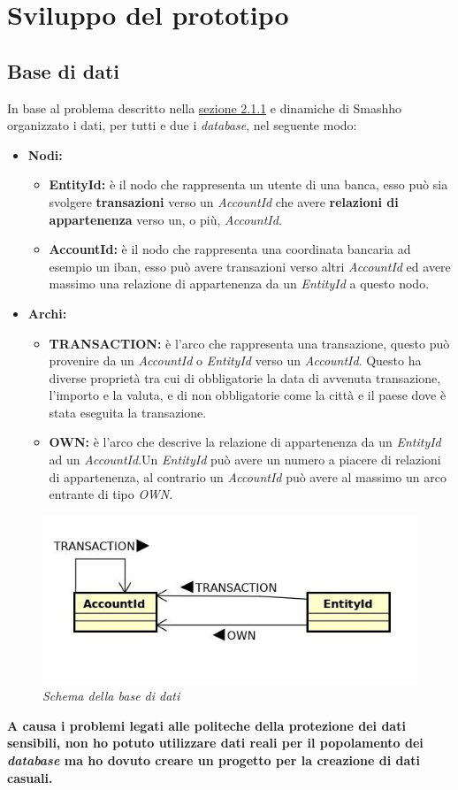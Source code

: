 \section{Sviluppo del prototipo}
\subsection{Base di dati}
In base al problema descritto nella \hyperref[sec:prob]{sezione 2.1.1} e dinamiche di Smash\textregistered ho organizzato i dati, per tutti e due i \textit{database}, nel seguente modo:
\begin{itemize}
\item{\textbf{Nodi:}}
\begin{itemize}
\item{\textbf{EntityId:}} è il nodo che rappresenta un utente di una banca, esso può sia svolgere \textbf{transazioni} verso un \textit{AccountId} che avere \textbf{relazioni di appartenenza} verso un, o più, \textit{AccountId}.
\item{\textbf{AccountId:}} è il nodo che rappresenta una coordinata bancaria ad esempio un iban, esso può avere transazioni verso altri \textit{AccountId} ed avere massimo una relazione di appartenenza da un \textit{EntityId} a questo nodo.
\end{itemize}
\item{\textbf{Archi:}}
\begin{itemize}
\item{\textbf{TRANSACTION:}} è l'arco che rappresenta una transazione, questo può provenire da un \textit{AccountId} o \textit{EntityId} verso un \textit{AccountId}. Questo ha diverse proprietà tra cui di obbligatorie la data di avvenuta transazione, l'importo e la valuta, e di non obbligatorie come la città e il paese dove è stata eseguita la transazione.
\item{\textbf{OWN:}} è l'arco che descrive la relazione di appartenenza da un \textit{EntityId} ad un \textit{AccountId}.Un \textit{EntityId} può avere un numero a piacere di relazioni di appartenenza, al contrario un \textit{AccountId} può avere al massimo un arco entrante di tipo \textit{OWN}.
\end{itemize}
\end{itemize}
\newpage
\begin{figure}[!ht]
	\centering
	\includegraphics[scale=0.4]{immagini/graph.jpg}
	\caption{\textit{Schema della base di dati}}
\end{figure}
\textbf{A causa i problemi legati alle politeche della protezione dei dati sensibili, non ho potuto utilizzare dati reali per il popolamento dei \textit{database} ma ho dovuto creare un progetto per la creazione di dati casuali.}

